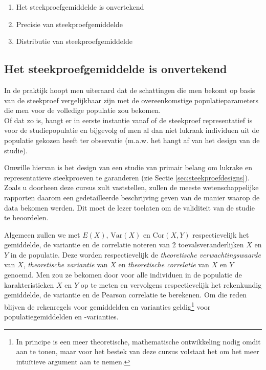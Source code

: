 \documentclass[
  12pt,dutch]{book}
\providecommand{\tightlist}{%
  \setlength{\itemsep}{0pt}\setlength{\parskip}{0pt}}
\theoremstyle{definition}
\theoremstyle{definition}
\theoremstyle{definition}
\theoremstyle{definition}
\theoremstyle{remark}
\begin{document}
\begin{enumerate}
\def\labelenumi{\arabic{enumi}.}
\tightlist
\item
  Het steekproefgemiddelde is onvertekend
\item
  Precisie van steekproefgemiddelde
\item
  Distributie van steekproefgemiddelde
\end{enumerate}

\subsection{Het steekproefgemiddelde is onvertekend}\label{het-steekproefgemiddelde-is-onvertekend}

In de praktijk hoopt men uiteraard dat de schattingen die men bekomt op basis van de steekproef vergelijkbaar zijn met de overeenkomstige populatieparameters die men voor de volledige populatie zou bekomen.\\
Of dat zo is, hangt er in eerste instantie vanaf of de steekproef representatief is voor de studiepopulatie en bijgevolg of men al dan niet lukraak individuen uit de populatie gekozen heeft ter observatie (m.a.w. het hangt af van het design van de studie).

Omwille hiervan is het design van een studie van primair belang om lukrake en representatieve steekproeven te garanderen (zie Sectie \ref{sec:steekproefdesigns}).
Zoals u doorheen deze cursus zult vaststellen, zullen de meeste wetenschappelijke rapporten daarom een gedetailleerde beschrijving geven van de manier waarop de data bekomen werden. Dit moet de lezer toelaten om de validiteit van de studie te beoordelen.

Algemeen zullen we met \(E(X)\), \(\text{Var}(X)\) en \(\text{Cor}(X,Y)\)
respectievelijk het gemiddelde, de variantie en de correlatie noteren van 2
toevalsveranderlijken \(X\) en \(Y\) in de populatie. Deze worden
respectievelijk de \emph{theoretische verwachtingswaarde} van \(X\), \emph{theoretische variantie} van \(X\) en \emph{theoretische correlatie} van \(X\) en \(Y\) genoemd.
Men zou ze bekomen door voor alle individuen in de populatie
de karakteristieken \(X\) en \(Y\) op te meten en vervolgens respectievelijk het
rekenkundig gemiddelde, de variantie en de Pearson correlatie te berekenen. Om die
reden blijven de rekenregels voor gemiddelden en varianties geldig\footnote{In principe is een meer theoretische, mathematische ontwikkeling nodig omdit aan te tonen, maar voor het bestek van deze cursus volstaat het om het
  meer intuïtieve argument aan te nemen.} voor populatiegemiddelden en
-varianties.
\end{document}
